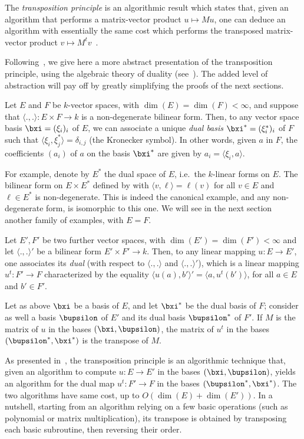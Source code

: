 \documentclass{sig-alternate}
\newcounter{algo}
\newcommand{\ang}[1]{\langle#1\rangle}
\begin{document}
The {\em transposition principle} is an algorithmic result which
states that, given an algorithm that performs a matrix-vector product
$u \mapsto M u$, one can deduce an algorithm with essentially the same
cost which performs the transposed matrix-vector product $v \mapsto
M^t v$~\cite[Ch.~13]{burgisser+clausen-shokrollahi}.

Following~\cite{df+thesis}, we give here a more abstract presentation
of the transposition principle, using the algebraic theory of duality
(see~\cite[Ch.~IX.1.8]{BourbakiAlgCom9}). The added level of abstraction
will pay off by greatly simplifying the proofs of the next sections.

Let $E$ and $F$ be $k$-vector spaces, with $\dim(E)=\dim(F)<\infty$,
and suppose that $\ang{.,.}: E\times F \to k$ is a non-degenerate
bilinear form.  Then, to any vector space basis $\bxi=(\xi_i)_i$ of
$E$, we can associate a unique \emph{dual basis}
$\bxi^\ast=(\xi_i^\ast)_i$ of $F$ such that $ \ang{\xi_i,\xi^\ast_j} =
\delta_{i,j}$ (the Kronecker symbol).  In other words, given $a$ in
$F$, the coefficients $(a_i)$ of $a$ on the basis $\bxi^\ast$ are
given by $a_i=\ang{\xi_i, a}$.

For example, denote by $E^\ast$ the dual space of $E$, i.e.\ the
$k$-linear forms on $E$. The bilinear form on $E\times E^\ast$ defined
by with $\ang{v,\ell}=\ell(v)$ for all $v\in E$ and $\ell \in E^*$ is
non-degenerate. This is indeed the canonical example, and any
non-degenerate form, is isomorphic to this one. We will see in the
next section another family of examples, with $E=F$.

Let $E',F'$ be two further vector spaces, with $\dim(E')=\dim(F')<\infty$ and
let $\ang{.,.}'$ be a bilinear form $E'\times F' \to k$. Then, to
any linear mapping $u:E\to E'$, one associates its {\em dual}
(with respect to $\ang{.,.}$ and $\ang{.,.}'$), which is a linear
mapping $u^t: F' \to F$ characterized by the equality
$\ang{u(a),b'}'=\ang{a,u^t(b')}$, for all $a\in E$ and $b'\in F'$.

Let as above $\bxi$ be a basis of $E$, and let $\bxi^\ast$ be
the dual basis of $F$; consider as well a basis $\bupsilon$ of $E'$ and
its dual basis $\bupsilon^\ast$ of $F'$. If $M$ is the matrix of $u$ in
the bases $(\bxi,\bupsilon)$, the matrix of $u^t$ in the bases
$(\bupsilon^\ast,\bxi^\ast)$ is the transpose of $M$. 

As presented in~\cite{bostan+lecerf+schost:tellegen,df+thesis}, the
transposition principle is an algorithmic technique that, given an
algorithm to compute $u: E \to E'$ in the bases $(\bxi,\bupsilon)$,
yields an algorithm for the dual map $u^t: F' \to F$ in the bases
$(\bupsilon^\ast,\bxi^\ast)$. The two algorithms have same cost, up to
$O(\dim(E)+\dim(E'))$. In a nutshell, starting from an algorithm relying
on a few basic operations (such as polynomial or matrix
multiplication), its transpose is obtained by transposing each basic
subroutine, then reversing their order.
\end{document}
